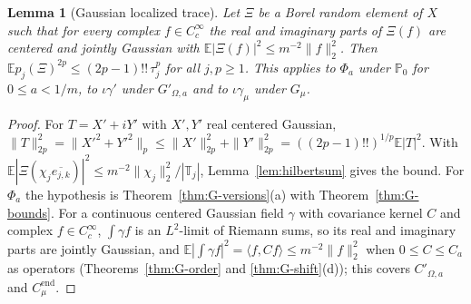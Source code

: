 \documentclass[11pt]{article}
\theoremstyle{plain}
\newtheorem{lemma}[theorem]{Lemma}
\theoremstyle{definition}
\theoremstyle{remark}
\newcommand{\E}{\mathbb{E}}
\newcommand{\PP}{\mathbb{P}}
\newcommand{\T}{\mathbb{T}}
\newcommand{\Cend}{C^{\mathrm{end}}_{\mu}}
\newcommand{\conj}[1]{\overline{#1}}
\begin{document}
\begin{lemma}[Gaussian localized trace]\label{lem:gausshilbert}
Let $\Xi$ be a Borel random element of $X$ such that for every complex
$f\in C_c^{\infty}$ the real and imaginary parts of $\Xi(f)$ are centered and jointly
Gaussian with $\E|\Xi(f)|^{2}\le m^{-2}\|f\|_2^{2}$. Then $\E p_j(\Xi)^{2p}\le(2p-1)!!\,\tau_j^{p}$ for all
$j,p\ge1$. This applies to $\Phi_a$ under $\PP_0$ for $0\le a<1/m$, to $\iota\gamma'$ under
$G'_{\Omega,a}$ and to $\iota\gamma_\mu$ under $G_\mu$.
\end{lemma}

\begin{proof}
For $T=X'+iY'$ with $X',Y'$ real centered Gaussian,
$\|T\|_{2p}^{2}=\|X'^{2}+Y'^{2}\|_p\le\|X'\|_{2p}^{2}+\|Y'\|_{2p}^{2}=((2p-1)!!)^{1/p}\E|T|^{2}$. With
$\E|\Xi(\chi_j\conj{e_{j,k}})|^{2}\le m^{-2}\|\chi_j\|_2^{2}/|\T_j|$, Lemma~\ref{lem:hilbertsum} gives
the bound. For $\Phi_a$ the hypothesis is Theorem~\ref{thm:G-versions}(a) with
Theorem~\ref{thm:G-bounds}. For a continuous centered Gaussian field $\gamma$ with
covariance kernel $C$ and complex $f\in C_c^{\infty}$, $\int\gamma f$ is an $L^{2}$-limit of
Riemann sums, so its real and imaginary parts are jointly Gaussian, and
$\E|\int\gamma f|^{2}=\langle f,Cf\rangle\le m^{-2}\|f\|_2^{2}$ when $0\le C\le C_a$ as operators
(Theorems~\ref{thm:G-order} and \ref{thm:G-shift}(d)); this covers $C'_{\Omega,a}$ and
$\Cend$.
\end{proof}
\end{document}
